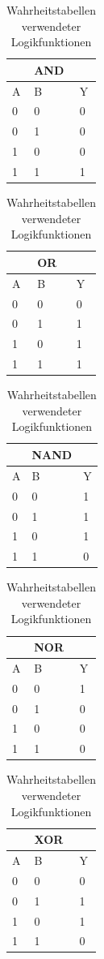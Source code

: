 \begin{table}[ht]
    \centering
    \caption{Wahrheitstabellen verwendeter Logikfunktionen}
    \label{tab:wahrheitstabellen-verwendeter-logikfunktionen}
    \begin{tabular}{| l | l || l |}
        \hline
        & AND & \\
        \hline
        A & B & Y \\
        \hline
        0 & 0 & 0 \\
        0 & 1 & 0 \\
        1 & 0 & 0 \\
        1 & 1 & 1 \\
        \hline
    \end{tabular}
    \quad
    \begin{tabular}{| l | l || l |}
        \hline
        & OR & \\
        \hline
        A & B & Y \\
        \hline
        0 & 0 & 0 \\
        0 & 1 & 1 \\
        1 & 0 & 1 \\
        1 & 1 & 1 \\
        \hline
    \end{tabular}
    \quad
    \begin{tabular}{| l | l || l |}
        \hline
        & NAND & \\
        \hline
        A & B & Y \\
        \hline
        0 & 0 & 1 \\
        0 & 1 & 1 \\
        1 & 0 & 1 \\
        1 & 1 & 0 \\
        \hline
    \end{tabular}
    \quad
    \begin{tabular}{| l | l || l |}
        \hline
        & NOR & \\
        \hline
        A & B & Y \\
        \hline
        0 & 0 & 1 \\
        0 & 1 & 0 \\
        1 & 0 & 0 \\
        1 & 1 & 0 \\
        \hline
    \end{tabular}
    \quad
    \begin{tabular}{| l | l || l |}
        \hline
        & XOR & \\
        \hline
        A & B & Y \\
        \hline
        0 & 0 & 0 \\
        0 & 1 & 1 \\
        1 & 0 & 1 \\
        1 & 1 & 0 \\
        \hline
    \end{tabular}
\end{table}

